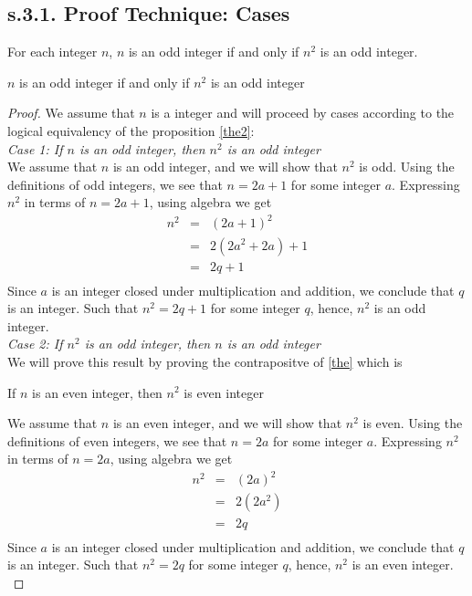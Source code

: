 \newpage
\subsection{s.3.1. Proof Technique: Cases}

\begin{example}
For each integer $n$, $n$ is an odd integer if and only if $n^2$ is an odd integer. \\

\begin{tcolorbox}
	\begin{theorem}
	\label{the2}		
		$n$ is an odd integer if and only if $n^2$ is an odd integer
	\end{theorem}
\end{tcolorbox}

\begin{proof}
    We assume that $n$ is a integer and will proceed by cases according to the logical equivalency of the proposition \ref{the2}: \\
    
    {\it Case 1: If $n$ is an odd integer, then $n^2$ is an odd integer } \\
    We assume that $n$ is an odd integer, and we will show that $n^2$ is odd. Using the definitions of odd integers, we see that $n = 2a + 1$ for some integer $a$. Expressing $n^2$ in terms of $n = 2a + 1$, using algebra we get
        \begin{eqnarray*}
        n^2 & = & (2a + 1)^2  \nonumber \\
        & = & 2(2a^2 + 2a) + 1 \nonumber \\
        & = & 2q + 1 \nonumber \\
        \end{eqnarray*}
    Since $a$ is an integer closed under multiplication and addition, we conclude that $q$ is an integer. Such that $n^2 = 2q + 1$ for some integer $q$, hence, $n^2$ is an odd integer. \\
    
    {\it Case 2: If $n^2$ is an odd integer, then $n$ is an odd integer} \\
    We will prove this result by proving the contrapositve of \ref{the} which is
    	\begin{center}
    		If $n$ is an even integer, then $n^2$ is even integer
    	\end{center}
    
    We assume that $n$ is an even integer, and we will show that $n^2$ is even. Using the definitions of even integers, we see that $n = 2a$ for some integer $a$. Expressing $n^2$ in terms of $n = 2a$, using algebra we get
        \begin{eqnarray*}
        n^2 & = & (2a)^2  \nonumber \\
        & = & 2(2a^2) \nonumber \\
        & = & 2q \nonumber \\
        \end{eqnarray*}
    Since $a$ is an integer closed under multiplication and addition, we conclude that $q$ is an integer. Such that $n^2 = 2q$ for some integer $q$, hence, $n^2$ is an even integer. \\
    

\end{proof}
\end{example}
